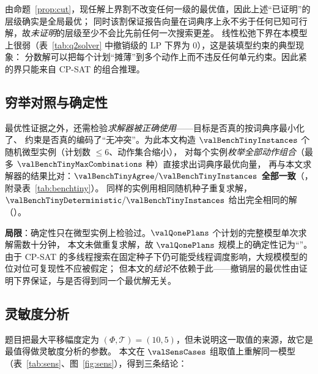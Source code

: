 由命题~\ref{prop:cut}，现任解上界割不改变任何一级的最优值，因此上述“已证明”的层级确实是全局最优；
同时该割保证报告向量在词典序上永不劣于任何已知可行解，故\emph{未证明}的层级至少不会比先前任何一次搜索更差。
线性松弛下界在本模型上很弱（表~\ref{tab:q2solver} 中撤销级的 LP 下界为 $0$），这是装填型约束的典型现象：
分数解可以把每个计划“摊薄”到多个动作上而不违反任何单元约束。因此紧的界只能来自 CP-SAT 的组合推理。

\subsection{穷举对照与确定性}

最优性证据之外，还需检验\emph{求解器被正确使用}——目标是否真的按词典序最小化了、
约束是否真的编码了“无冲突”。为此本文构造 $\valBenchTinyInstances$ 个随机微型实例（计划数 $\le 6$、动作集合缩小），
对每个实例\emph{枚举全部动作组合}（最多 $\valBenchTinyMaxCombinations$ 种）直接求出词典序最优向量，
再与本文求解器的结果比对：\textbf{$\valBenchTinyAgree/\valBenchTinyInstances$ 全部一致}（\valBenchTinyAllAgree{}，附录表~\ref{tab:benchtiny}）。
同样的实例用相同随机种子重复求解，$\valBenchTinyDeterministic/\valBenchTinyInstances$ 给出完全相同的解（\valBenchTinyAllDeterministic{}）。

\textbf{局限}：确定性只在微型实例上检验过。$\valQonePlans$ 个计划的完整模型单次求解需数十分钟，
本文未做重复求解，故 $\valQonePlans$ 规模上的确定性记为“\valQtwoDeterministic{}”。
由于 CP-SAT 的多线程搜索在固定种子下仍可能受线程调度影响，大规模模型的位对位可复现性不应被假定；
但本文的\emph{结论}不依赖于此——撤销层的最优性由证明下界保证，与是否得到同一个最优解无关。

\subsection{灵敏度分析}
\label{sec:sens}

\begin{table}[htbp]
\centering\small
\caption{消解方案对最大平移幅度 $(\Phi,\mathcal{T})$ 的灵敏度。第四行 $(10,5)$ 为题目给定值，即正文的问题 2 主结果。
每个情形的解都通过了独立校验（\valSensAllValid{}）。}
\label{tab:sens}
\setlength{\tabcolsep}{5pt}
\resizebox{\linewidth}{!}{}
\end{table}

题目把最大平移幅度定为 $(\Phi,\mathcal{T})=(10,5)$，但未说明这一取值的来源，故它是最值得做灵敏度分析的参数。
本文在 $\valSensCases$ 组取值上重解同一模型（表~\ref{tab:sens}、图~\ref{fig:sens}），得到三条结论：

